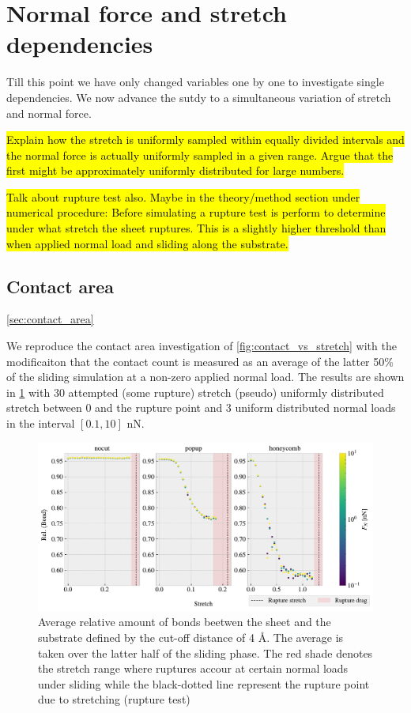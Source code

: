 \section{Normal force and stretch dependencies}\label{sec:load_and_stretch}
Till this point we have only changed variables one by one to investigate single dependencies. We now advance the sutdy to a simultaneous variation of stretch and normal force.

\hl{Explain how the stretch is uniformly sampled within equally divided intervals and the normal force is actually uniformly sampled in a given range. Argue that the first might be approximately uniformly distributed for large numbers.}

\hl{Talk about rupture test also. Maybe in the theory/method section under numerical procedure: Before simulating a rupture test is perform to determine under what stretch the sheet ruptures. This is a slightly higher threshold than when applied normal load and sliding along the substrate.}

\subsection{Contact area}\cref{sec:contact_area}

We reproduce the contact area investigation of \cref{fig:contact_vs_stretch} with the modificaiton that the contact count is measured as an average of the latter 50\% of the sliding simulation at a non-zero applied normal load. The results are shown in \cref{fig:multi_stretch_contact} with 30 attempted (some rupture) stretch (pseudo) uniformly distributed stretch between 0 and the rupture point and 3 uniform distributed normal loads in the interval $[0.1, 10]$ nN. 


\begin{figure}[H]
  \centering
  \includegraphics[width=\linewidth]{figures/baseline/multi_stretch_area_compare.pdf}
  \caption{Average relative amount of bonds beetwen the sheet and the substrate defined by the cut-off distance of 4 Å. The average is taken over the latter half of the sliding phase. The red shade denotes the stretch range where ruptures accour at certain normal loads under sliding while the black-dotted line represent the rupture point due to stretching (rupture test)}
  \label{fig:multi_stretch_contact}
\end{figure}

